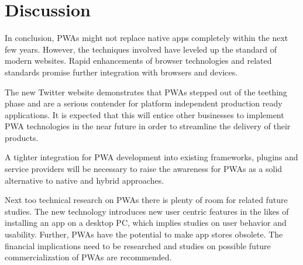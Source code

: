 \chapter{Discussion}

In conclusion, PWAs might not replace native apps completely within the next few years. However, the techniques involved have leveled up the standard of modern websites. Rapid enhancements of browser technologies and related standards promise further integration with browsers and devices.

The new Twitter website demonstrates that PWAs stepped out of the teething phase and are a serious contender for platform independent production ready applications. It is expected that this will entice other businesses to implement PWA technologies in the near future in order to streamline the delivery of their products.

A tighter integration for PWA development into existing frameworks, plugins and service providers will be necessary to raise the awareness for PWAs as a solid alternative to native and hybrid approaches.

Next too technical research on PWAs there is plenty of room for related future studies. The new technology introduces new user centric features in the likes of installing an app on a desktop PC, which implies studies on user behavior and usability. Further, PWAs have the potential to make app stores obsolete. The financial implications need to be researched and studies on possible future commercialization of PWAs are recommended.
